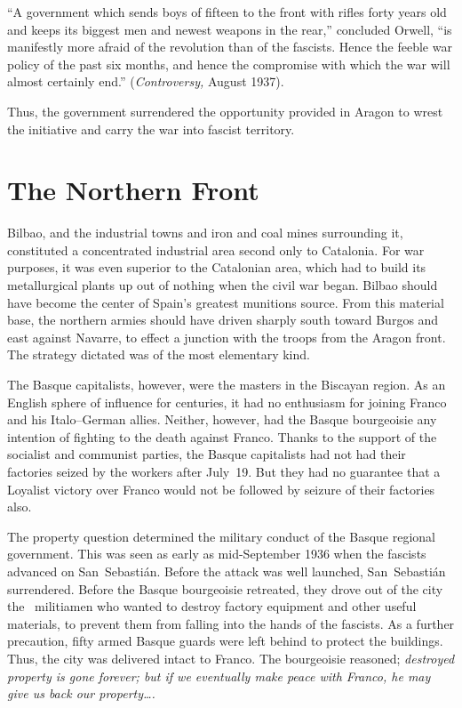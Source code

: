 ``A government which sends boys of fifteen to the front with rifles forty years old and keeps its biggest men and newest weapons in the rear,\kn\kn'' concluded Orwell, ``is manifestly more afraid of the revolution than of the fascists. Hence the feeble war policy of the past six months, and hence the compromise with which the war will almost certainly end.\kn\kn'' (\emph{Controversy,} August 1937).

Thus, the government surrendered the opportunity provided in Aragon to wrest the initiative and carry the war into fascist territory.

\section{The Northern Front}

Bilbao, and the industrial towns and iron and coal mines surrounding it, constituted a concentrated industrial area second only to Catalonia. For war purposes, it was even superior to the Catalonian area, which had to build its metallurgical plants up out of nothing when the civil war began. Bilbao should have become the center of Spain’s greatest munitions source. From this material base, the northern armies should have driven sharply south toward Burgos and east against Navarre, to effect a junction with the troops from the Aragon front. The strategy dictated was of the most elementary kind.

The Basque capitalists, however\kn, were the masters in the Biscayan region. As an English sphere of influence for centuries, it had no enthusiasm for joining Franco and his Italo--German allies. Neither\kn, however\kn, had the Basque bourgeoisie any intention of fighting to the death against Franco. Thanks to the support of the socialist and communist parties, the Basque capitalists had not had their factories seized by the workers after July~19. But they had no guarantee that a Loyalist victory over Franco would not be followed by seizure of their factories also.

\indexCNT{}
The property question determined the military conduct of the Basque regional government. This was seen as early as mid-Sep\-tem\-ber 1936 when the fascists advanced on San~Sebasti\'an. Before the attack was well launched, San~Sebasti\'an surrendered. Before the Basque bourgeoisie retreated, they drove out of the city the \CNT\ militiamen who wanted to destroy factory equipment and other useful materials, to prevent them from falling into the hands of the fascists. As a further precaution, fifty armed Basque guards were left behind to protect the buildings. Thus, the city was delivered intact to Franco. The bourgeoisie reasoned; \emph{destroyed property is gone forever; but if we eventually make peace with Franco, he may give us back our property\dots.}

